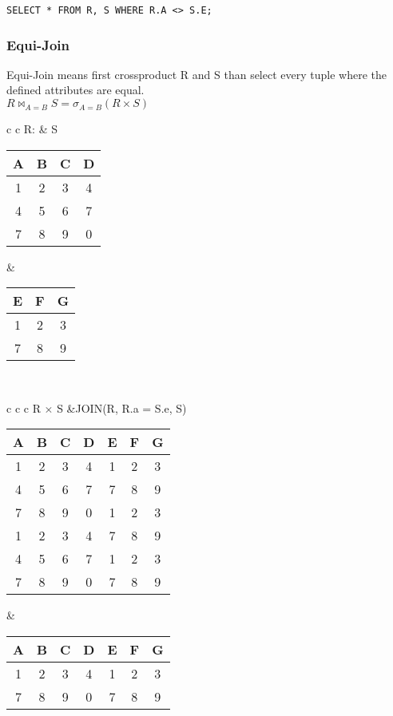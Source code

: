 \lstset{language=SQL,tabsize=4,captionpos=b,frame=single,
basicstyle=\footnotesize}
\begin{lstlisting}[caption=SQL NoEqui-Join]
SELECT * FROM R, S WHERE R.A <> S.E;
\end{lstlisting}

\subsubsection{Equi-Join}
Equi-Join means first crossproduct R and S than select every tuple where the
defined attributes are equal.\\
$R \bowtie_{A = B} S = \sigma_{A = B} (R \times S) $

\begin{tabular}{ c c}
	R: & S \\
	\begin{tabular}{|c|c|c|c|}
		\hline
		A & B & C & D\\
		\hline
		1 & 2 & 3 & 4\\
		\hline
		4 & 5 & 6 & 7\\
		\hline
		7 & 8 & 9 & 0\\
		\hline
	\end{tabular} &

	\begin{tabular}{|c|c|c|}
		\hline
		E & F & G \\
		\hline
		1 & 2 & 3\\
		\hline
		7 & 8 & 9\\
		\hline
	\end{tabular}
\end{tabular}\\

\hspace{-0.5cm}
\begin{tabular}{ c c c }
	R $\times$ S &JOIN(R, R.a = S.e, S)\\
	\begin{tabular}{|c|c|c|c|c|c|c|}
		\hline
		A & B & C & D & E & F & G\\
		\hline
		1 & 2 & 3 & 4 & 1 & 2 & 3\\
		\hline
		4 & 5 & 6 & 7 & 7 & 8 & 9\\
		\hline
		7 & 8 & 9 & 0 & 1 & 2 & 3\\
		\hline                     
		1 & 2 & 3 & 4 & 7 & 8 & 9\\
		\hline
		4 & 5 & 6 & 7 & 1 & 2 & 3\\
		\hline                     
		7 & 8 & 9 & 0 & 7 & 8 & 9\\
		\hline
	\end{tabular} &

	\begin{tabular}{|c|c|c|c|c|c|c|}
		\hline
		A & B & C & D & E & F & G\\
		\hline
		1 & 2 & 3 & 4 & 1 & 2 & 3\\
		\hline
		7 & 8 & 9 & 0 & 7 & 8 & 9\\
		\hline
	\end{tabular} 
\end{tabular} 

